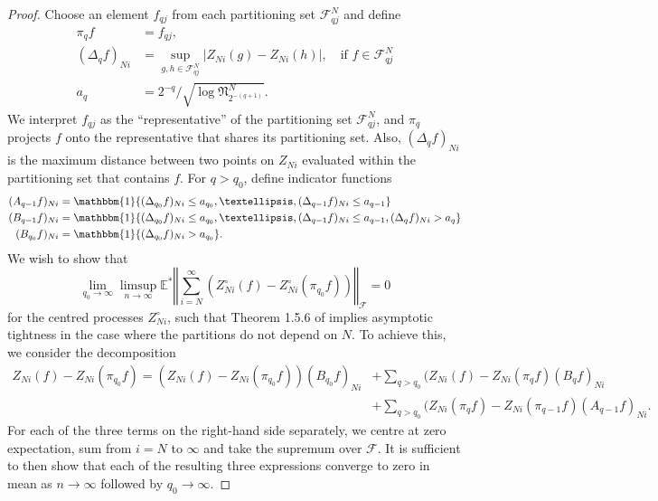 \documentclass[11pt,a4paper]{article}
\newcommand{\E}{\mathbb{E}}
\begin{document}
\begin{appendices}
\begin{proof}
    Choose an element $f_{qj}$ from each partitioning set $\mathcal{F}^{N}_{qj}$ and define
    \begin{align*}
        \pi_{q}f &= f_{qj}, \\
        (\Delta_{q}f)_{Ni} &= \sup_{g,h \in \mathcal{F}_{q j}^{N}} |Z_{Ni}(g) - Z_{Ni}(h)|, \quad \text{if }f \in \mathcal{F}^{N}_{qj}\\
        a_{q} &= 2^{-q} \bigg/ \sqrt{\log \mathfrak{N}_{2^{-(q+1)}}^{N}}.
    \end{align*}
    We interpret $f_{qj}$ as the ``representative'' of the partitioning set $\mathcal{F}^{N}_{qj}$, and $\pi_{q}$ projects $f$ onto the representative that shares its partitioning set. Also, $(\Delta_{q}f)_{Ni}$ is the maximum distance between two points on $Z_{Ni}$ evaluated within the partitioning set that contains $f$. 
    For $q > q_{0}$, define indicator functions
    \begin{align*}
        (A_{q-1}f)_{Ni} &= \mathbbm{1}\{(\Delta_{q_0}f)_{Ni} \leq a_{q_0},\ldots, (\Delta_{q-1}f)_{Ni} \leq a_{q-1}\} \\
        (B_{q-1}f)_{Ni} &= \mathbbm{1}\{(\Delta_{q_0}f)_{Ni} \leq a_{q_0},\ldots, (\Delta_{q-1}f)_{Ni} \leq a_{q-1}, (\Delta_{q}f)_{Ni} > a_{q}\} \\
        (B_{q_0}f)_{Ni} &= \mathbbm{1}\{(\Delta_{q_0}f)_{Ni} > a_{q_0}\}.
    \end{align*}
    We wish to show that
    \begin{equation} \label{eqn::asymp_tight}
        \lim_{q_0 \rightarrow \infty} \limsup_{n \rightarrow \infty} \E^{*} \left\Vert \sum_{i=N}^{\infty} (Z_{Ni}^{\circ}(f) - Z_{Ni}^{\circ}(\pi_{q_0}f))\right\Vert_{\mathcal{F}} = 0
    \end{equation}
    for the centred processes $Z_{Ni}^{\circ}$, such that Theorem 1.5.6 of \cite{vanderVaart2023} implies asymptotic tightness in the case where the partitions do not depend on $N$. To achieve this, we consider the decomposition
    \begin{align*}
        Z_{Ni}(f) - Z_{Ni}(\pi_{q_0}f) = (Z_{Ni}(f) - Z_{Ni}(\pi_{q_0}f))(B_{q_0}f)_{Ni} &+ \sum_{q > q_{0}}(Z_{Ni}(f) - Z_{Ni}(\pi_{q}f)(B_{q}f)_{Ni}\\
        &+ \sum_{q > q_{0}}(Z_{Ni}(\pi_{q}f) - Z_{Ni}(\pi_{q-1}f)(A_{q-1}f)_{Ni}.
    \end{align*}
    For each of the three terms on the right-hand side separately, we centre at zero expectation, sum from $i=N$ to $\infty$ and take the supremum over $\mathcal{F}$. It is sufficient to then show that each of the resulting three expressions converge to zero in mean as $n \rightarrow \infty$ followed by $q_{0} \rightarrow \infty$.


\end{proof}
\end{appendices}
\end{document}
